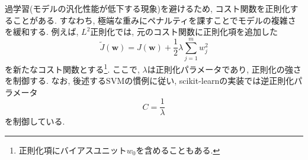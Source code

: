 \documentclass[uplatex]{jsarticle}
\theoremstyle{definition}
\numberwithin{equation}{section}
\begin{document}
過学習(モデルの汎化性能が低下する現象)を避けるため, コスト関数を正則化することがある.
すなわち, 極端な重みにペナルティを課すことでモデルの複雑さを緩和する.
例えば, $L^{2}$正則化では, 元のコスト関数に正則化項を追加した
\begin{equation}
    \tilde{J}(\bm{w}) = J(\bm{w}) + \frac{1}{2}\lambda\sum_{j = 1}^{m} w_{j}^{2}
\end{equation}
を新たなコスト関数とする\footnote{正則化項にバイアスユニット$w_{0}$を含めることもある.}.
ここで, $\lambda$は正則化パラメータであり, 正則化の強さを制御する.
なお, 後述するSVMの慣例に従い, scikit-learnの実装では逆正則化パラメータ
\begin{equation}
    C = \frac{1}{\lambda}
\end{equation}
を制御している.
\end{document}
